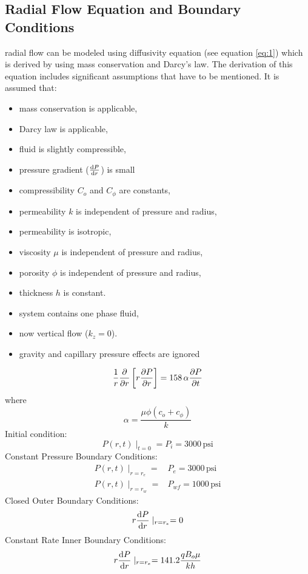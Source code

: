 \documentclass[12pt,letterpaper,titlepage]{article}
\begin{document}
\subsection{Radial Flow Equation and Boundary Conditions }
radial flow can be modeled using diffusivity equation (see equation \ref{eq:1})
which is derived by using mass conservation and Darcy's law. The derivation of this equation includes significant assumptions that have to be mentioned. It is assumed that:
\begin{itemize}
\item mass conservation is applicable,
\item Darcy law is applicable,
\item fluid is slightly compressible,
\item pressure gradient ($\dv{P}{r}$) is small
\item compressibility $C_o$ and $C_\phi$ are constants,
\item permeability $k$ is independent of pressure and radius,
\item permeability is isotropic,
\item viscosity $\mu$ is independent of pressure and radius,
\item porosity $\phi$ is independent of pressure and radius,
\item thickness $h$ is constant.
\item system contains one phase fluid,
\item now vertical flow ($k_z=0$).
\item gravity and capillary pressure effects are ignored
\end{itemize}

\begin{equation}\label{eq:1}
\frac{1}{r}\pdv{}{r}\left[r\pdv{P}{r}\right] = 158\,\alpha \pdv{P}{t}
\end{equation}
where $$\alpha=\frac{\mu \phi (c_o+c_\phi)}{k}$$
Initial condition:
\begin{equation}
P(r,t)\mid_{t=0}=P_i=3000\,\text{psi}
\end{equation}
Constant Pressure Boundary Conditions:
\begin{align}
P(r,t)\mid_{r=r_e}=&P_e=3000\,\text{psi}\\
P(r,t)\mid_{r=r_w}=&P_{wf}=1000\,\text{psi}
\end{align}
Closed Outer Boundary Conditions:
\begin{equation}
r\dv{P}{r}\mid_{r=r_e}=0\\
\end{equation}
Constant Rate Inner Boundary Conditions:
\begin{equation}
r\dv{P}{r}\mid_{r=r_e}=141.2\frac{qB_o\mu}{kh}\\
\end{equation}
\end{document}
